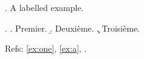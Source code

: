 

\ex.\label{ex:one} A labelled example.

\ex.\label{ex:para}
\a. Premier.
\b. Deuxi\`eme.
\c. Troisi\`eme.

Refs: \ref{ex:one}, \ref{ex:a}, .

